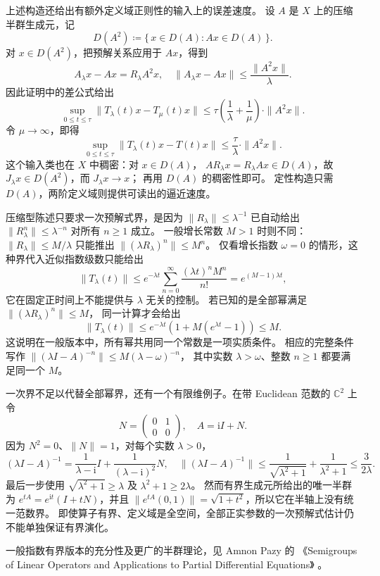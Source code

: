 上述构造还给出有额外定义域正则性的输入上的误差速度。
设 \(A\) 是 \(X\) 上的压缩半群生成元，记
\[
 D(A^2)\coloneqq\{\,x\in D(A):Ax\in D(A)\,\}.
\]
对 \(x\in D(A^2)\)，把预解关系应用于 \(Ax\)，得到
\[
 A_\lambda x-Ax=R_\lambda A^2x,
 \quad
 \|A_\lambda x-Ax\|\le\frac{\|A^2x\|}{\lambda}.
\]
因此证明中的差公式给出
\[
 \sup_{0\le t\le\tau}\|T_\lambda(t)x-T_\mu(t)x\|
 \le\tau\left(\frac1\lambda+\frac1\mu\right)\cdot\|A^2x\|.
\]
令 \(\mu\to\infty\)，即得
\[
 \sup_{0\le t\le\tau}\|T_\lambda(t)x-T(t)x\|
 \le\frac{\tau}{\lambda}\cdot\|A^2x\|.
\]
这个输入类也在 \(X\) 中稠密：对 \(x\in D(A)\)，
\(AR_\lambda x=R_\lambda Ax\in D(A)\)，故
\(J_\lambda x\in D(A^2)\)，而 \(J_\lambda x\to x\)；
再用 \(D(A)\) 的稠密性即可。
定性构造只需 \(D(A)\)，两阶定义域则提供可读出的逼近速度。

\ProseParagraphBreak
压缩型陈述只要求一次预解式界，是因为
\(\|R_\lambda\|\le\lambda^{-1}\) 已自动给出
\(\|R_\lambda^n\|\le\lambda^{-n}\) 对所有 \(n\ge1\) 成立。
一般增长常数 \(M>1\) 时则不同：
\(\|R_\lambda\|\le M/\lambda\) 只能推出
\(\|(\lambda R_\lambda)^n\|\le M^n\)。
仅看增长指数 \(\omega=0\) 的情形，这种界代入近似指数级数只能给出
\[
 \|T_\lambda(t)\|
 \le e^{-\lambda t}\sum_{n=0}^\infty
          \frac{(\lambda t)^nM^n}{n!}
 =e^{(M-1)\lambda t},
\]
它在固定正时间上不能提供与 \(\lambda\) 无关的控制。
若已知的是全部幂满足 \(\|(\lambda R_\lambda)^n\|\le M\)，
同一计算才会给出
\[
 \|T_\lambda(t)\|
 \le e^{-\lambda t}\left(1+M(e^{\lambda t}-1)\right)\le M.
\]
这说明在一般版本中，所有幂共用同一个常数是一项实质条件。
相应的完整条件写作
\(\|(\lambda I-A)^{-n}\|\le M(\lambda-\omega)^{-n}\)，
其中实数 \(\lambda>\omega\)、整数 \(n\ge1\) 都要满足同一个 \(M\)。

一次界不足以代替全部幂界，还有一个有限维例子。在带 Euclidean 范数的
\(\mathbb C^2\) 上令
\[
 N=\begin{pmatrix}0&1\\0&0\end{pmatrix},
 \quad A=\mathrm iI+N.
\]
因为 \(N^2=0\)、\(\|N\|=1\)，对每个实数 \(\lambda>0\)，
\[
 (\lambda I-A)^{-1}
 =\frac1{\lambda-\mathrm i}I+\frac1{(\lambda-\mathrm i)^2}N,
 \quad
 \|(\lambda I-A)^{-1}\|
 \le\frac1{\sqrt{\lambda^2+1}}+\frac1{\lambda^2+1}
 \le\frac{3}{2\lambda}.
\]
最后一步使用 \(\sqrt{\lambda^2+1}\ge\lambda\) 及
\(\lambda^2+1\ge2\lambda\)。
然而有界生成元所给出的唯一半群为
\(e^{tA}=e^{\mathrm it}(I+tN)\)，并且
\(\|e^{tA}(0,1)\|=\sqrt{1+t^2}\)，所以它在半轴上没有统一范数界。
即使算子有界、定义域是全空间，全部正实参数的一次预解式估计仍不能单独保证有界演化。

一般指数有界版本的充分性及更广的半群理论，见 Amnon Pazy 的
《Semigroups of Linear Operators and Applications to Partial Differential Equations》
\cite{Pazy1983Semigroups}。

